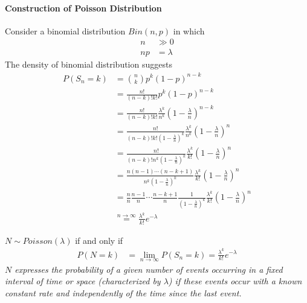 \documentclass{article}
\begin{document}
   	\paragraph{Construction of Poisson Distribution} Consider a binomial distribution $Bin(n, p)$ in which
   	\begin{align}
   		n &\gg 0 \\
   		np &= \lambda
   	\end{align}
   	The density of binomial distribution suggests
   	\begin{align}
   		P(S_n=k) &= \binom{n}{k} p^k (1-p)^{n-k} \\
   		&= \frac{n!}{(n-k)!k!} p^k (1-p)^{n-k} \\
   		&= \frac{n!}{(n-k)!k!} \frac{\lambda^k}{n^k}\left(1 - \frac{\lambda}{n}\right)^{n-k} \\
   		&= \frac{n!}{(n-k)!k! \left(1 - \frac{\lambda}{n}\right)^{k}} \frac{\lambda^k}{n^k}\left(1 - \frac{\lambda}{n}\right)^{n} \\
   		&= \frac{n!}{(n-k)!n^k \left(1 - \frac{\lambda}{n}\right)^{k}}
   		 \frac{\lambda^k}{k!}
   		 \left(1 - \frac{\lambda}{n}\right)^{n} \\
   		&= \frac{n(n-1)\cdots(n-k+1)}{n^k \left(1 - \frac{\lambda}{n}\right)^{k}}
   		 \frac{\lambda^k}{k!}
   		 \left(1 - \frac{\lambda}{n}\right)^{n} \\
   		&= \frac{n}{n} \frac{n-1}{n} \cdots \frac{n-k+1}{n} \frac{1}{\left(1 - \frac{\lambda}{n}\right)^{k}}
   		\frac{\lambda^k}{k!}
   		\left(1 - \frac{\lambda}{n}\right)^{n} \\
   		&\overset{n \to \infty}{=}\frac{\lambda^k}{k!} e^{-\lambda}
   	\end{align}
   	
   	\begin{definition}
   		$N \sim Poisson(\lambda)$ if and only if
   		\begin{align}
   			P(N=k) &= \lim_{n \to \infty} P(S_n=k) = \frac{\lambda^k}{k!} e^{-\lambda}
   		\end{align}
   		\emph{$N$ expresses the probability of a given number of events occurring in a fixed interval of time or space (characterized by $\lambda$) if these events occur with a known constant rate and independently of the time since the last event.}
   	\end{definition}
   	
\end{document}
